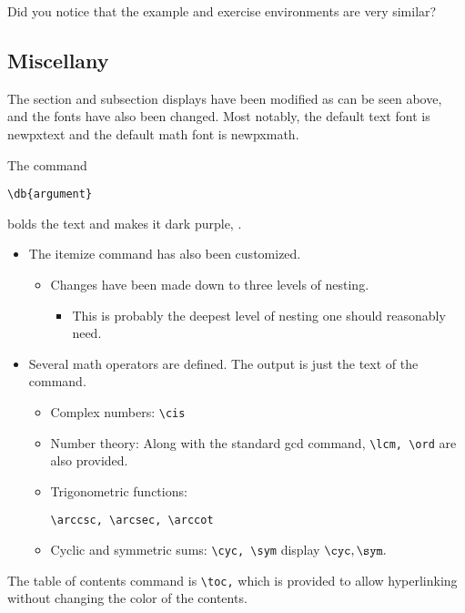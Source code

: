 \documentclass{lucky}
\begin{document}
\begin{exer}
Did you notice that the example and exercise environments are very similar?
\end{exer}

\subsection{Miscellany}

The section and subsection displays have been modified as can be seen above, and the fonts have also been changed. Most notably, the default text font is newpxtext and the default math font is newpxmath.

The command

\begin{verbatim}
\db{argument}
\end{verbatim}

bolds the text and makes it dark purple, .

\begin{itemize}
\item The itemize command has also been customized.
\begin{itemize}
\item Changes have been made down to three levels of nesting.
\begin{itemize}
\item This is probably the deepest level of nesting one should reasonably need.
\end{itemize}
\end{itemize}
\item Several math operators are defined. The output is just the text of the command.
\begin{itemize}
\item Complex numbers: \verb|\cis|
\item Number theory: Along with the standard gcd command, \verb|\lcm, \ord| are also provided.
\item Trigonometric functions: \begin{verbatim}
\arccsc, \arcsec, \arccot
\end{verbatim}
\item Cyclic and symmetric sums: \verb|\cyc, \sym| display $\cyc, \sym.$
\end{itemize}
\end{itemize}

The table of contents command is \verb|\toc,| which is provided to allow hyperlinking without changing the color of the contents.
\end{document}

